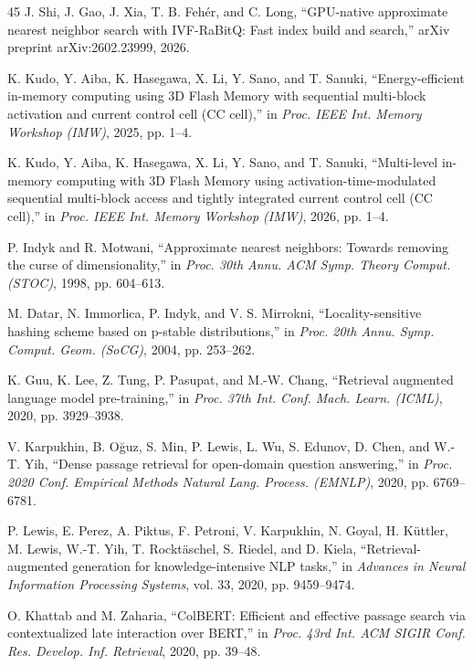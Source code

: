 \begin{thebibliography}{45}
J. Shi, J. Gao, J. Xia, T. B. Feh\'er, and C. Long, ``GPU-native approximate nearest neighbor search with IVF-RaBitQ: Fast index build and search,'' arXiv preprint arXiv:2602.23999, 2026.

K. Kudo, Y. Aiba, K. Hasegawa, X. Li, Y. Sano, and T. Sanuki, ``Energy-efficient in-memory computing using 3D Flash Memory with sequential multi-block activation and current control cell (CC cell),'' in \emph{Proc. IEEE Int. Memory Workshop (IMW)}, 2025, pp. 1--4.

K. Kudo, Y. Aiba, K. Hasegawa, X. Li, Y. Sano, and T. Sanuki, ``Multi-level in-memory computing with 3D Flash Memory using activation-time-modulated sequential multi-block access and tightly integrated current control cell (CC cell),'' in \emph{Proc. IEEE Int. Memory Workshop (IMW)}, 2026, pp. 1--4.

P. Indyk and R. Motwani, ``Approximate nearest neighbors: Towards removing the curse of dimensionality,'' in \emph{Proc. 30th Annu. ACM Symp. Theory Comput. (STOC)}, 1998, pp. 604--613.

M. Datar, N. Immorlica, P. Indyk, and V. S. Mirrokni, ``Locality-sensitive hashing scheme based on p-stable distributions,'' in \emph{Proc. 20th Annu. Symp. Comput. Geom. (SoCG)}, 2004, pp. 253--262.

K. Guu, K. Lee, Z. Tung, P. Pasupat, and M.-W. Chang, ``Retrieval augmented language model pre-training,'' in \emph{Proc. 37th Int. Conf. Mach. Learn. (ICML)}, 2020, pp. 3929--3938.

V. Karpukhin, B. O\u{g}uz, S. Min, P. Lewis, L. Wu, S. Edunov, D. Chen, and W.-T. Yih, ``Dense passage retrieval for open-domain question answering,'' in \emph{Proc. 2020 Conf. Empirical Methods Natural Lang. Process. (EMNLP)}, 2020, pp. 6769--6781.

P. Lewis, E. Perez, A. Piktus, F. Petroni, V. Karpukhin, N. Goyal, H. K\"uttler, M. Lewis, W.-T. Yih, T. Rockt\"aschel, S. Riedel, and D. Kiela, ``Retrieval-augmented generation for knowledge-intensive NLP tasks,'' in \emph{Advances in Neural Information Processing Systems}, vol. 33, 2020, pp. 9459--9474.

O. Khattab and M. Zaharia, ``ColBERT: Efficient and effective passage search via contextualized late interaction over BERT,'' in \emph{Proc. 43rd Int. ACM SIGIR Conf. Res. Develop. Inf. Retrieval}, 2020, pp. 39--48.


\end{thebibliography}
